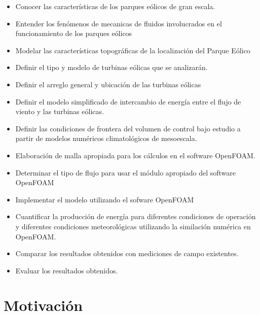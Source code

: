 \begin{itemize}
\item Conocer las características de los parques eólicos de gran escala.
\item Entender los fenómenos de mecanicas de fluidos involucrados en el funcionamiento de los parques eólicos
\item Modelar las características topográficas de la localización del Parque Eólico
\item Definir el tipo y modelo de turbinas eólicas que se analizarán.
\item Definir el arreglo general y ubicación de las turbinas eólicas
\item Definir el modelo simplificado  de intercambio de energía entre el flujo de viento y las turbinas eólicas. 
\item Definir las condiciones de frontera del volumen de control bajo estudio a partir de modelos numéricos climatológicos de mesoescala.
\item Elaboración de malla apropiada para los cálculos en el software OpenFOAM.
\item Determinar el tipo de flujo para usar el módulo apropiado del software OpenFOAM
\item Implementar el modelo utilizando el sofware OpenFOAM
\item Cuantificar la producción de energía para diferentes condiciones de operación y diferentes condiciones meteorológicas utilizando la similación numérica en OpenFOAM.
\item Comparar los resultados obtenidos con mediciones de campo existentes.
\item Evaluar los resultados obtenidos.
\end{itemize}


\section{Motivación}


